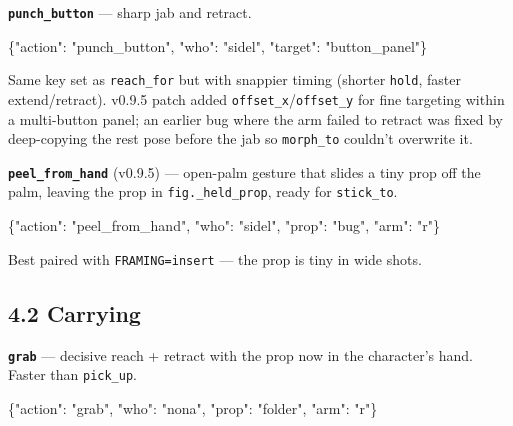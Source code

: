\documentclass[
  11pt,
]{book}
\newenvironment{Shaded}{}{}
\newcommand{\DataTypeTok}[1]{\textcolor[rgb]{0.56,0.13,0.00}{#1}}
\newcommand{\FunctionTok}[1]{\textcolor[rgb]{0.02,0.16,0.49}{#1}}
\newcommand{\StringTok}[1]{\textcolor[rgb]{0.25,0.44,0.63}{#1}}
\begin{document}
\textbf{\texttt{punch\_button}} --- sharp jab and retract.

\begin{Shaded}
\begin{Highlighting}[]
\FunctionTok{\{}\DataTypeTok{"action"}\FunctionTok{:} \StringTok{"punch\_button"}\FunctionTok{,} \DataTypeTok{"who"}\FunctionTok{:} \StringTok{"sidel"}\FunctionTok{,} \DataTypeTok{"target"}\FunctionTok{:} \StringTok{"button\_panel"}\FunctionTok{\}}
\end{Highlighting}
\end{Shaded}

Same key set as \texttt{reach\_for} but with snappier timing (shorter
\texttt{hold}, faster extend/retract). v0.9.5 patch added
\texttt{offset\_x}/\texttt{offset\_y} for fine targeting within a
multi-button panel; an earlier bug where the arm failed to retract was
fixed by deep-copying the rest pose before the jab so \texttt{morph\_to}
couldn't overwrite it.

\textbf{\texttt{peel\_from\_hand}} (v0.9.5) --- open-palm gesture that
slides a tiny prop off the palm, leaving the prop in
\texttt{fig.\_held\_prop}, ready for \texttt{stick\_to}.

\begin{Shaded}
\begin{Highlighting}[]
\FunctionTok{\{}\DataTypeTok{"action"}\FunctionTok{:} \StringTok{"peel\_from\_hand"}\FunctionTok{,} \DataTypeTok{"who"}\FunctionTok{:} \StringTok{"sidel"}\FunctionTok{,} \DataTypeTok{"prop"}\FunctionTok{:} \StringTok{"bug"}\FunctionTok{,} \DataTypeTok{"arm"}\FunctionTok{:} \StringTok{"r"}\FunctionTok{\}}
\end{Highlighting}
\end{Shaded}

Best paired with \texttt{FRAMING=insert} --- the prop is tiny in wide
shots.

\subsection{4.2 Carrying}\label{carrying}

\textbf{\texttt{grab}} --- decisive reach + retract with the prop now in
the character's hand. Faster than \texttt{pick\_up}.

\begin{Shaded}
\begin{Highlighting}[]
\FunctionTok{\{}\DataTypeTok{"action"}\FunctionTok{:} \StringTok{"grab"}\FunctionTok{,} \DataTypeTok{"who"}\FunctionTok{:} \StringTok{"nona"}\FunctionTok{,} \DataTypeTok{"prop"}\FunctionTok{:} \StringTok{"folder"}\FunctionTok{,} \DataTypeTok{"arm"}\FunctionTok{:} \StringTok{"r"}\FunctionTok{\}}
\end{Highlighting}
\end{Shaded}
\end{document}
